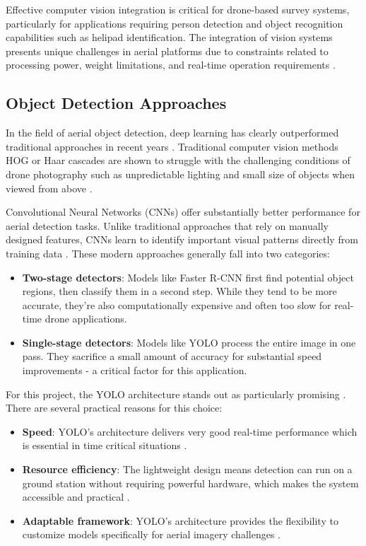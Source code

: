 Effective computer vision integration is critical for drone-based survey systems, particularly for applications requiring person detection and object recognition capabilities such as helipad identification. The integration of vision systems presents unique challenges in aerial platforms due to constraints related to processing power, weight limitations, and real-time operation requirements \cite{Hossain2019}.

\subsection{Object Detection Approaches}

In the field of aerial object detection, deep learning has clearly outperformed traditional approaches in recent years \cite{Zhang2021, Carrio2018}. Traditional computer vision methods HOG or Haar cascades are shown to struggle with the challenging conditions of drone photography such as unpredictable lighting and small size of objects when viewed from above \cite{AlKaff2018, Kyrkou2019}.

Convolutional Neural Networks (CNNs) offer substantially better performance for aerial detection tasks. Unlike traditional approaches that rely on manually designed features, CNNs learn to identify important visual patterns directly from training data \cite{Hossain2019}. These modern approaches generally fall into two categories:


\begin{itemize}
    \item \textbf{Two-stage detectors}: Models like Faster R-CNN \cite{Ren2017} first find potential object regions, then classify them in a second step. While they tend to be more accurate, they're also computationally expensive and often too slow for real-time drone applications.
    
    \item \textbf{Single-stage detectors}: Models like YOLO \cite{Redmon2016} process the entire image in one pass. They sacrifice a small amount of accuracy for substantial speed improvements - a critical factor for this application.
\end{itemize}

For this project, the YOLO architecture stands out as particularly promising \cite{Ly2019}. There are several practical reasons for this choice:

\begin{itemize}
    \item \textbf{Speed}: YOLO's architecture delivers very good real-time performance which is essential in time critical situations \cite{Tijtgat2017}.
    
    \item \textbf{Resource efficiency}: The lightweight design means detection can run on a ground station without requiring powerful hardware, which makes the system accessible and practical \cite{Wu2019}.
    
    \item \textbf{Adaptable framework}: YOLO's architecture provides the flexibility to customize models specifically for aerial imagery challenges \cite{Benjumea2021}.
\end{itemize}

